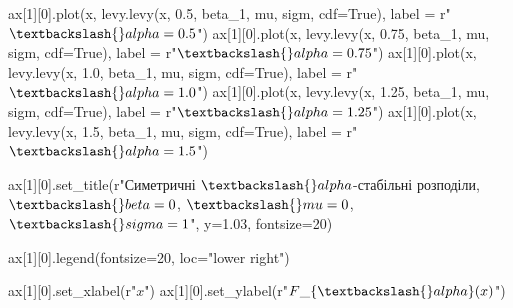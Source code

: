 \documentclass[
  letterpaper,
]{report}
\newenvironment{Shaded}{\begin{snugshade}}{\end{snugshade}}
\newcommand{\DecValTok}[1]{\textcolor[rgb]{0.68,0.00,0.00}{#1}}
\newcommand{\FloatTok}[1]{\textcolor[rgb]{0.68,0.00,0.00}{#1}}
\newcommand{\NormalTok}[1]{\textcolor[rgb]{0.00,0.23,0.31}{#1}}
\newcommand{\OperatorTok}[1]{\textcolor[rgb]{0.37,0.37,0.37}{#1}}
\newcommand{\StringTok}[1]{\textcolor[rgb]{0.13,0.47,0.30}{#1}}
\newcommand{\VariableTok}[1]{\textcolor[rgb]{0.07,0.07,0.07}{#1}}
\newcommand{\VerbatimStringTok}[1]{\textcolor[rgb]{0.13,0.47,0.30}{#1}}
\begin{document}
\begin{Shaded}
\begin{Highlighting}[]
\NormalTok{ax[}\DecValTok{1}\NormalTok{][}\DecValTok{0}\NormalTok{].plot(x, levy.levy(x, }\FloatTok{0.5}\NormalTok{, beta\_1, mu, sigm, cdf}\OperatorTok{=}\VariableTok{True}\NormalTok{), label }\OperatorTok{=} \VerbatimStringTok{r"$ \textbackslash{}alpha=0.5 $"}\NormalTok{)}
\NormalTok{ax[}\DecValTok{1}\NormalTok{][}\DecValTok{0}\NormalTok{].plot(x, levy.levy(x, }\FloatTok{0.75}\NormalTok{, beta\_1, mu, sigm, cdf}\OperatorTok{=}\VariableTok{True}\NormalTok{), label }\OperatorTok{=} \VerbatimStringTok{r"$ \textbackslash{}alpha=0.75 $"}\NormalTok{)}
\NormalTok{ax[}\DecValTok{1}\NormalTok{][}\DecValTok{0}\NormalTok{].plot(x, levy.levy(x, }\FloatTok{1.0}\NormalTok{, beta\_1, mu, sigm, cdf}\OperatorTok{=}\VariableTok{True}\NormalTok{), label }\OperatorTok{=} \VerbatimStringTok{r"$ \textbackslash{}alpha=1.0 $"}\NormalTok{)}
\NormalTok{ax[}\DecValTok{1}\NormalTok{][}\DecValTok{0}\NormalTok{].plot(x, levy.levy(x, }\FloatTok{1.25}\NormalTok{, beta\_1, mu, sigm, cdf}\OperatorTok{=}\VariableTok{True}\NormalTok{), label }\OperatorTok{=} \VerbatimStringTok{r"$ \textbackslash{}alpha=1.25 $"}\NormalTok{)}
\NormalTok{ax[}\DecValTok{1}\NormalTok{][}\DecValTok{0}\NormalTok{].plot(x, levy.levy(x, }\FloatTok{1.5}\NormalTok{, beta\_1, mu, sigm, cdf}\OperatorTok{=}\VariableTok{True}\NormalTok{), label }\OperatorTok{=} \VerbatimStringTok{r"$ \textbackslash{}alpha=1.5 $"}\NormalTok{)}

\NormalTok{ax[}\DecValTok{1}\NormalTok{][}\DecValTok{0}\NormalTok{].set\_title(}\VerbatimStringTok{r"Симетричні $\textbackslash{}alpha${-}стабільні розподіли, $ \textbackslash{}beta = 0 $, $ \textbackslash{}mu = 0 $, $ \textbackslash{}sigma = 1 $"}\NormalTok{, y}\OperatorTok{=}\FloatTok{1.03}\NormalTok{, fontsize}\OperatorTok{=}\DecValTok{20}\NormalTok{)}

\NormalTok{ax[}\DecValTok{1}\NormalTok{][}\DecValTok{0}\NormalTok{].legend(fontsize}\OperatorTok{=}\DecValTok{20}\NormalTok{, loc}\OperatorTok{=}\StringTok{"lower right"}\NormalTok{)}

\NormalTok{ax[}\DecValTok{1}\NormalTok{][}\DecValTok{0}\NormalTok{].set\_xlabel(}\VerbatimStringTok{r"$ x $"}\NormalTok{)}
\NormalTok{ax[}\DecValTok{1}\NormalTok{][}\DecValTok{0}\NormalTok{].set\_ylabel(}\VerbatimStringTok{r"$ F\_\{\textbackslash{}alpha\}(x) $"}\NormalTok{)}


\end{Highlighting}
\end{Shaded}
\end{document}
